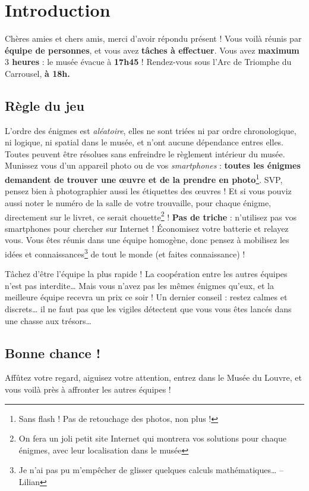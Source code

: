 \chapter{Introduction}

\vspace*{-30pt}

Chères amies et chers amis, merci d'avoir répondu présent !
%
Vous voilà réunis par \textbf{équipe de \intervalparequipe{} personnes},
et vous avez \textbf{\nbenigmes{} tâches à effectuer}.
%
Vous avez \textbf{maximum $3$ heures} : le musée évacue à \textbf{17h45} !
%
Rendez-vous sous l'Arc de Triomphe du Carrousel, \textbf{à 18h.}


\section*{Règle du jeu}

L'ordre des énigmes est \emph{aléatoire}, elles ne sont triées ni par ordre chronologique, ni logique, ni spatial dans le musée, et n'ont aucune dépendance entres elles.
%
Toutes peuvent être résolues sans enfreindre le règlement intérieur du musée.
Munissez vous d'un appareil photo ou de vos \emph{smartphones} : \textbf{toutes les énigmes demandent de trouver une œuvre et de la prendre en photo}\footnote{Sans flash ! Pas de retouchage des photos, non plus !}. SVP, pensez bien à photographier aussi les étiquettes des œuvres !
Et si vous pouviz aussi noter le numéro de la salle de votre trouvaille, pour chaque énigme, directement sur le livret, ce serait chouette\footnote{On fera un joli petit site Internet qui montrera vos solutions pour chaque énigmes, avec leur localisation dans le musée} !
\textbf{Pas de triche} : n'utilisez pas vos smartphones pour chercher sur Internet !
Économisez votre batterie et relayez vous.
%
Vous êtes réunis dans une équipe homogène, donc pensez à mobilisez les idées et connaissances\footnote{Je n'ai pas pu m'empêcher de glisser quelques calculs mathématiques… -- Lilian} de tout le monde (et faites connaissance) !

Tâchez d'être l'équipe la plus rapide ! La coopération entre les autres équipes n'est pas interdite…
Mais vous n'avez pas les mêmes énigmes qu'eux, et la meilleure équipe recevra un prix ce soir !
%
Un dernier conseil : restez calmes et discrets… il ne faut pas que les vigiles détectent que vous vous êtes lancés dans une chasse aux trésors…


\section*{Bonne chance !}
Affûtez votre regard, aiguisez votre attention, entrez dans le Musée du Louvre, et vous voilà près à affronter les autres équipes !

